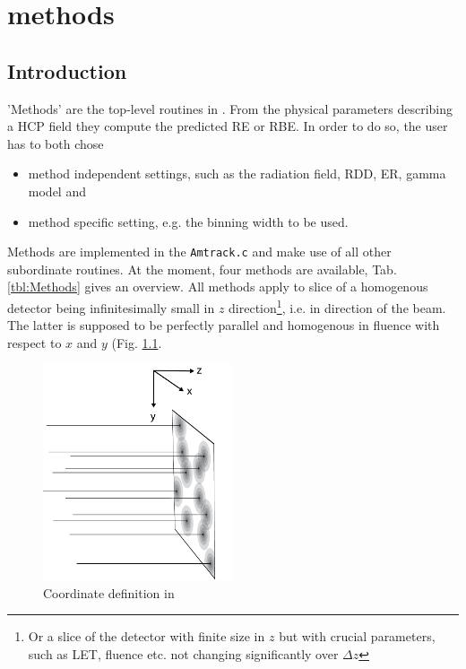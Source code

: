 
\chapter{\la{} methods}

\section{Introduction}
'Methods' are the top-level routines in \la{}. From the physical parameters describing a HCP field they compute the predicted RE or RBE. In order to do so, the user has to both chose 
\begin{itemize}
\item{method independent settings, such as the radiation field, RDD, ER, gamma model and}
\item{method specific setting, e.g. the binning width to be used.}
\end{itemize}

Methods are implemented in the \texttt{Amtrack.c} and make use of all other subordinate routines. At the moment, four methods are available, Tab. \ref{tbl:Methods} gives an overview. All 	methods apply to slice of a homogenous detector being infinitesimally small in $z$ direction\footnote{Or a slice of the detector with finite size in $z$ but with crucial parameters, such as LET, fluence etc. not changing significantly over $\Delta z$}, i.e. in direction of the beam. The latter is supposed to be perfectly parallel and homogenous in fluence with respect to $x$ and $y$ (Fig. \ref{fig:Coordinates}. 

\begin{figure}
	\centering
		\includegraphics[bb=0 0 839 952,width=0.5\textwidth]{pictures/CoordinatesMethods.png}
	\caption{Coordinate definition in \la{}}
	\label{fig:Coordinates}
\end{figure}

